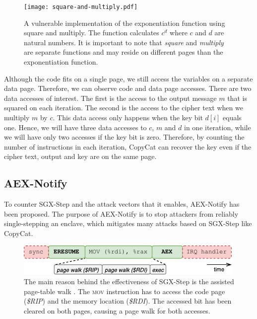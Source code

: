 \documentclass{llncs}
\begin{document}
\begin{figure}[t!]
  \centering
  \texttt{[image: square-and-multiply.pdf]}
  \caption{A vulnerable implementation of the exponentiation function using square and multiply.
    The function calculates $c^d$ where $c$ and $d$ are natural numbers.
    It is important to note that \emph{square} and \emph{multiply} are separate functions
    and may reside on different pages than the exponentiation function.}
  \label{fig:square-and-multiply}
\end{figure}

Although the code fits on a single page,
we still access the variables on a separate data page.
Therefore, we can observe code and data page accesses.
There are two data accesses of interest.
The first is the access to the output message $m$ that is squared on each
iteration.
The second is the access to the cipher text when we multiply $m$ by $c$.
This data access only happens when the key bit $d[i]$ equals one.
Hence, we will have three data accesses to $c$, $m$ and $d$ in one iteration,
while we will have only two accesses if the key bit is zero.
Therefore, by counting the number of instructions in each iteration,
CopyCat can recover the key even if the cipher text, output and key are on the
same page.

\subsection{AEX-Notify}
\label{sec:aex-notify}

To counter SGX-Step and the attack vectors that it enables, AEX-Notify has been
proposed.
The purpose of AEX-Notify is to stop attackers from reliably single-stepping an
enclave, which mitigates many attacks based on SGX-Step like CopyCat.

\begin{figure}
  \centering
  \includegraphics{images/sgx-step-without-prefetch.pdf}
  \caption{
    The main reason behind the effectiveness of SGX-Step is the assisted
    page-table walk \cite{ConstableBCXXAK23}.
    The \textsc{mov} instruction has to access the code page
    (\textsf{\itshape\$RIP}) and the memory location (\textsf{\itshape\$RDI}).
    The accessed bit has been cleared on both pages, causing a page walk for
    both accesses.}
  \label{fig:pte-walk}
\end{figure}
\end{document}
